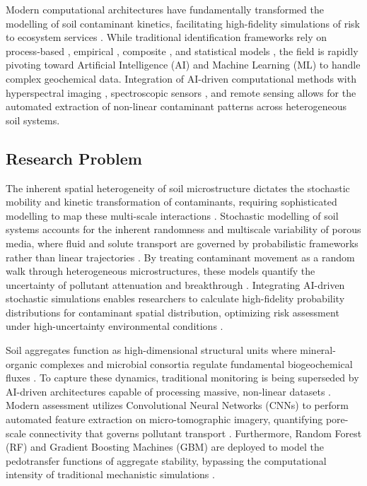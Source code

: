 \documentclass[land,article,submit,pdftex,moreauthors]{Definitions/mdpi}
\begin{document}
Modern computational architectures have fundamentally transformed the
modelling of soil contaminant kinetics, facilitating high-fidelity simulations
of risk to ecosystem services
\cite{Liu2020,Zhang2021,Proshad2025,Lemenkova2025d}. While traditional
identification frameworks rely on process-based
\cite{Giannakis2017,Karlen2019}, empirical \cite{Benavidez2018,Lal2020},
composite \cite{Sadhukhan2022}, and statistical models
\cite{Lu2020,Feng2024,Lemenkova2024b}, the field is rapidly pivoting toward
Artificial Intelligence (AI) and Machine Learning (ML) to handle complex
geochemical data. Integration of AI-driven computational methods
\cite{Proshad2025,Lemenkova2025d,Feng2024,Li2023} with hyperspectral imaging
\cite{Fan2025,Shi2021}, spectroscopic sensors \cite{Xu2026,Guo2025}, and
remote sensing \cite{Lemenkova2025b,Zhang2022} allows for the automated
extraction of non-linear contaminant patterns across heterogeneous soil
systems.

\subsection{Research Problem}\label{sec1.2}

The inherent spatial heterogeneity of soil microstructure dictates the
stochastic mobility and kinetic transformation of contaminants, requiring
sophisticated modelling to map these multi-scale interactions \cite{Vogel2018}.
Stochastic modelling of soil systems accounts for the inherent randomness and
multiscale variability of porous media, where fluid and solute transport are
governed by probabilistic frameworks rather than linear trajectories
\cite{Vogel2018,Lemenkova2023}. By treating contaminant movement as a random
walk through heterogeneous microstructures, these models quantify the
uncertainty of pollutant attenuation and breakthrough \cite{Lu2020,Karlen2019}.
Integrating AI-driven stochastic simulations enables researchers to calculate
high-fidelity probability distributions for contaminant spatial distribution,
optimizing risk assessment under high-uncertainty environmental conditions
\cite{Li2023,Feng2024}.

Soil aggregates function as high-dimensional structural units where
mineral-organic complexes and microbial consortia regulate fundamental
biogeochemical fluxes \cite{Six2004}. To capture these dynamics, traditional
monitoring is being superseded by AI-driven architectures capable of
processing massive, non-linear datasets \cite{Lal2015,Baveye2016,Lehmann2020}.
Modern assessment utilizes Convolutional Neural Networks (CNNs) to perform
automated feature extraction on micro-tomographic imagery, quantifying
pore-scale connectivity that governs pollutant transport
\cite{Demiral2026,Chen2025}. Furthermore, Random Forest (RF) and Gradient
Boosting Machines (GBM) are deployed to model the pedotransfer functions of
aggregate stability, bypassing the computational intensity of traditional
mechanistic simulations \cite{DemissieNaveda2026,Guo2026}.
\end{document}

